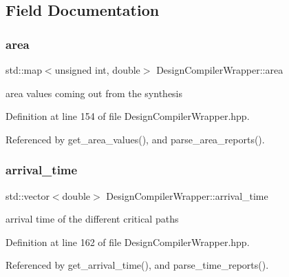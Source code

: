 \subsection{Field Documentation}
\mbox{\label{classDesignCompilerWrapper_ab6cb68a1d47aca1be34d667cd09356ed}} 
\subsubsection{\texorpdfstring{area}{area}}
{\footnotesize\ttfamily std\+::map$<$unsigned int, double$>$ Design\+Compiler\+Wrapper\+::area\hspace{0.3cm}{\ttfamily [protected]}}



area values coming out from the synthesis 



Definition at line 154 of file Design\+Compiler\+Wrapper.\+hpp.



Referenced by get\+\_\+area\+\_\+values(), and parse\+\_\+area\+\_\+reports().

\mbox{\label{classDesignCompilerWrapper_af699c3910eb8a7a2beb2c9c20af83d2d}} 
\subsubsection{\texorpdfstring{arrival\+\_\+time}{arrival\_time}}
{\footnotesize\ttfamily std\+::vector$<$double$>$ Design\+Compiler\+Wrapper\+::arrival\+\_\+time\hspace{0.3cm}{\ttfamily [protected]}}



arrival time of the different critical paths 



Definition at line 162 of file Design\+Compiler\+Wrapper.\+hpp.



Referenced by get\+\_\+arrival\+\_\+time(), and parse\+\_\+time\+\_\+reports().

\mbox{\label{classDesignCompilerWrapper_a7f00337678d6a6aec9c71dec04c10bb7}} 
